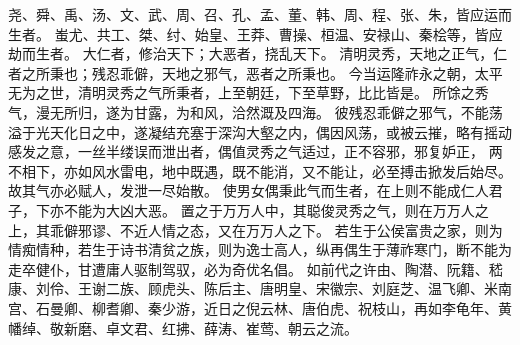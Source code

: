 尧、舜、禹、汤、文、武、周、召、孔、孟、董、韩、周、程、张、朱，皆应运而生者。
蚩尤、共工、桀、纣、始皇、王莽、曹操、桓温、安禄山、秦桧等，皆应劫而生者。
大仁者，修治天下；大恶者，挠乱天下。
清明灵秀，天地之正气，仁者之所秉也；残忍乖僻，天地之邪气，恶者之所秉也。
今当运隆祚永之朝，太平无为之世，清明灵秀之气所秉者，上至朝廷，下至草野，比比皆是。
所馀之秀气，漫无所归，遂为甘露，为和风，洽然溉及四海。
彼残忍乖僻之邪气，不能荡溢于光天化日之中，遂凝结充塞于深沟大壑之内，偶因风荡，或被云摧，略有摇动感发之意，一丝半缕误而泄出者，偶值灵秀之气适过，正不容邪，邪复妒正，
两不相下，亦如风水雷电，地中既遇，既不能消，又不能让，必至搏击掀发后始尽。
故其气亦必赋人，发泄一尽始散。
使男女偶秉此气而生者，在上则不能成仁人君子，下亦不能为大凶大恶。
置之于万万人中，其聪俊灵秀之气，则在万万人之上，其乖僻邪谬、不近人情之态，又在万万人之下。
若生于公侯富贵之家，则为情痴情种，若生于诗书清贫之族，则为逸士高人，纵再偶生于薄祚寒门，断不能为走卒健仆，甘遭庸人驱制驾驭，必为奇优名倡。
如前代之许由、陶潜、阮籍、嵇康、刘伶、王谢二族、顾虎头、陈后主、唐明皇、宋徽宗、刘庭芝、温飞卿、米南宫、石曼卿、柳耆卿、秦少游，近日之倪云林、唐伯虎、祝枝山，再如李龟年、黄幡绰、敬新磨、卓文君、红拂、薛涛、崔莺、朝云之流。
